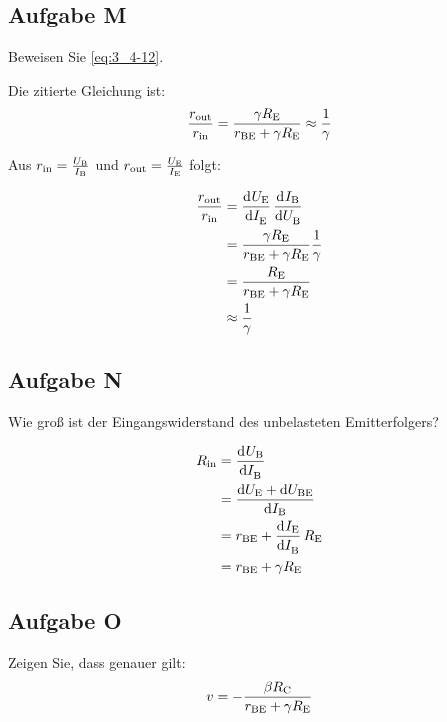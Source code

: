 \FloatBarrier
\subsection{Aufgabe M}

\begin{problem}
	Beweisen Sie \eqref{eq:3_4-12}.
\end{problem}

Die zitierte Gleichung ist:
\begin{equation}
	\label{eq:3_4-12}
	\frac{r_\text{out}}{r_\text{in}}
	= \frac{\gamma R_\text{E}}{r_\text{BE} + \gamma R_\text{E}}
	\approx \frac 1\gamma
\end{equation}

Aus $r_\text{in}=\frac{U_\text{B}}{I_\text{B}}$ und $r_\text{out}=\frac{U_\text{E}}{I_\text{E}}$ folgt:

\begin{align*}
	\frac{r_\text{out}}{r_\text{in}} &= \dod\UE\IE \dod\IB\UB\\
	&= \frac{\gamma\RE}{r_\text{BE}+\gamma\RE}\frac1\gamma\\
	&= \frac{\RE}{r_\text{BE}+\gamma\RE}\\
	&\approx \frac 1\gamma
\end{align*}

\FloatBarrier
\subsection{Aufgabe N}

\begin{problem}
	Wie groß ist der Eingangswiderstand des unbelasteten Emitterfolgers?
\end{problem}

\begin{align*}
	R_\text{in} &= \dod\UB\IB\\
	&= \frac {\dif\UE+\dif\UBE}{\dif\IB}\\
	&= r_\text{BE} + \dod \IE\IB \RE\\
	&= r_\text{BE} + \gamma\RE
\end{align*}

\FloatBarrier
\subsection{Aufgabe O}

\begin{problem}
	Zeigen Sie, dass genauer gilt:
	\begin{equation}
		\label{eq:3_4-14}
		v = - \frac{\beta R_\text{C}}{r_\text{BE} + \gamma R_\text{E}}
	\end{equation}
\end{problem}

